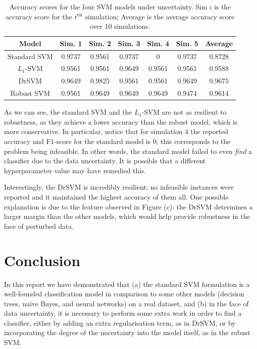 \documentclass[11pt]{article}
\newcommand\Tstrut{\rule{0pt}{2.6ex}}
\newcommand\Bstrut{\rule[-0.9ex]{0pt}{0pt}}
\newcommand{\tline}{\Tstrut\Bstrut\\}
\begin{document}
\begin{table}[H]
	\centering
	\captionsetup{font=footnotesize}
	\begin{tabular}{| c || c | c | c | c | c || c |}
		\hline
		\textbf{Model} & \textbf{Sim.	1} & \textbf{Sim. 2} & \textbf{Sim. 3} & \textbf{Sim. 4} & \textbf{Sim. 5} & \textbf{Average} 
		\tline\hline
		Standard SVM & 0.9737  &  0.9561 &   0.9737     &    0   & 0.9737 & 0.8728
		\tline\hline
		$L_1$-SVM & 0.9561 &   0.9561  &  0.9649  &  0.9561   & 0.9561 & 0.9588
		\tline\hline
		DrSVM & 0.9649  &  0.9825 &   0.9561  &  0.9561  &  0.9649 & 0.9675
		\tline\hline
		Robust SVM & 0.9561  &  0.9649 &   0.9649  &  0.9649   & 0.9474 & 0.9614

		\tline\hline
	\end{tabular}
	\caption{Accuracy scores for the four SVM models under uncertainty. Sim $i$ is the accuracy score for the $i^{\rm th}$ simulation; Average is the average accuracy score over 10 simulations.}
\end{table}


As we can see, the standard SVM and the $L_1$-SVM are not as resilient to robustness, as they achieve a lower accuracy than the robust model, which is more conservative. In particular, notice that for simulation 4 the reported accuracy and F1-score for the standard model is 0; this corresponds to the problem being infeasible. In other words, the standard model failed to even \emph{find} a classifier due to the data uncertainty. It is possible that a different hyperparameter value may have remedied this. 

Interestingly, the DrSVM is incredibly resilient; no infeasible instances were reported and it maintained the highest accuracy of them all. One possible explanation is due to the feature observed in Figure (c): the DrSVM determines a larger margin than the other models, which would help provide robustness in the face of perturbed data. 

\section*{Conclusion}

In this report we have demonstrated that (a) the standard SVM formulation is a well-founded classification model in comparison to some other models (decision trees, naive Bayes, and neural networks) on a real dataset, and (b) in the face of data uncertainty, it is necessary to perform some extra work in order to find a classifier, either by adding an extra regularisation term, as in DrSVM, or by incorporating the degree of the uncertainty into the model itself, as in the robust SVM. 
\end{document}
